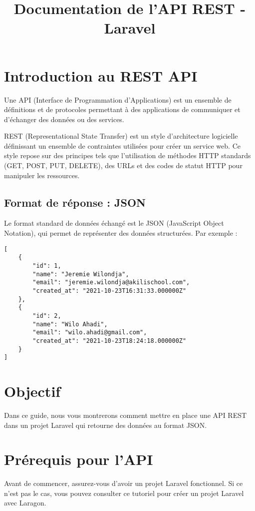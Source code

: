 \documentclass{article}
\title{Documentation de l'API REST - Laravel}
\author{}
\date{}
\begin{document}
\maketitle

\section{Introduction au REST API}

Une API (Interface de Programmation d'Applications) est un ensemble de définitions et de protocoles permettant à des applications de communiquer et d'échanger des données ou des services.

REST (Representational State Transfer) est un style d'architecture logicielle définissant un ensemble de contraintes utilisées pour créer un service web. Ce style repose sur des principes tels que l'utilisation de méthodes HTTP standards (GET, POST, PUT, DELETE), des URLs et des codes de statut HTTP pour manipuler les ressources.

\subsection{Format de réponse : JSON}
Le format standard de données échangé est le JSON (JavaScript Object Notation), qui permet de représenter des données structurées. Par exemple :

\begin{verbatim}
[
    {
        "id": 1,
        "name": "Jeremie Wilondja",
        "email": "jeremie.wilondja@akilischool.com",
        "created_at": "2021-10-23T16:31:33.000000Z"
    },
    {
        "id": 2,
        "name": "Wilo Ahadi",
        "email": "wilo.ahadi@gmail.com",
        "created_at": "2021-10-23T18:24:18.000000Z"
    }
]
\end{verbatim}

\section{Objectif}

Dans ce guide, nous vous montrerons comment mettre en place une API REST dans un projet Laravel qui retourne des données au format JSON.

\section{Prérequis pour l'API}

Avant de commencer, assurez-vous d'avoir un projet Laravel fonctionnel. Si ce n'est pas le cas, vous pouvez consulter ce tutoriel pour créer un projet Laravel avec Laragon.
\end{document}
